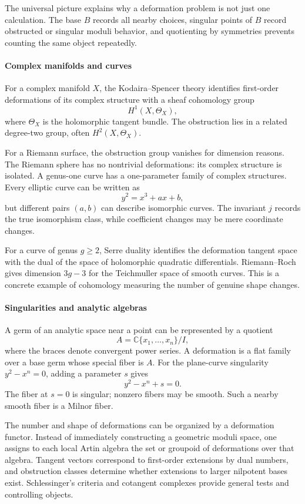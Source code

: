 The universal picture explains why a deformation problem is not just one calculation. The base $B$ records all nearby choices, singular points of $B$ record obstructed or singular moduli behavior, and quotienting by symmetries prevents counting the same object repeatedly.

\paragraph{Complex manifolds and curves}

For a complex manifold $X$, the Kodaira--Spencer theory identifies first-order deformations of its complex structure with a sheaf cohomology group
\[
 H^1(X,\Theta_X),
\]
where $\Theta_X$ is the holomorphic tangent bundle. The obstruction lies in a related degree-two group, often $H^2(X,\Theta_X)$.

For a Riemann surface, the obstruction group vanishes for dimension reasons. The Riemann sphere has no nontrivial deformations: its complex structure is isolated. A genus-one curve has a one-parameter family of complex structures. Every elliptic curve can be written as
\[
 y^2=x^3+ax+b,
\]
but different pairs $(a,b)$ can describe isomorphic curves. The invariant $j$ records the true isomorphism class, while coefficient changes may be mere coordinate changes.

For a curve of genus $g\geq2$, Serre duality identifies the deformation tangent space with the dual of the space of holomorphic quadratic differentials. Riemann--Roch gives dimension $3g-3$ for the Teichmuller space of smooth curves. This is a concrete example of cohomology measuring the number of genuine shape changes. \cite{deformation_theory_ref2,deformation_theory_ref4}

\paragraph{Singularities and analytic algebras}

A germ of an analytic space near a point can be represented by a quotient
\[
 A=\mathbb C\{x_1,\ldots,x_n\}/I,
\]
where the braces denote convergent power series. A deformation is a flat family over a base germ whose special fiber is $A$. For the plane-curve singularity $y^2-x^n=0$, adding a parameter $s$ gives
\[
 y^2-x^n+s=0.
\]
The fiber at $s=0$ is singular; nonzero fibers may be smooth. Such a nearby smooth fiber is a Milnor fiber.

The number and shape of deformations can be organized by a deformation functor. Instead of immediately constructing a geometric moduli space, one assigns to each local Artin algebra the set or groupoid of deformations over that algebra. Tangent vectors correspond to first-order extensions by dual numbers, and obstruction classes determine whether extensions to larger nilpotent bases exist. Schlessinger's criteria and cotangent complexes provide general tests and controlling objects. \cite{deformation_theory_ref1,deformation_theory_ref5}

